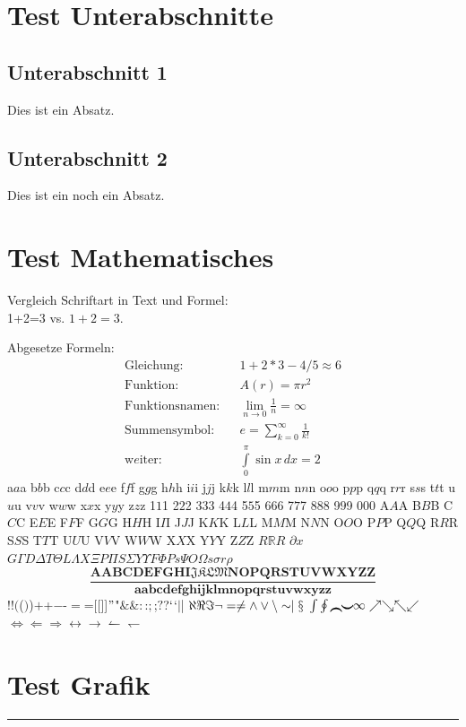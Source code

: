 \documentclass[a0paper,noDIN,MathematikA0]{tudmathposter}
\begin{document}
\begin{multicols}{2}
\section*{Test Unterabschnitte}
\subsection*{Unterabschnitt 1}
Dies ist ein Absatz.
\subsection*{Unterabschnitt 2}
Dies ist ein noch ein Absatz.

\vfill
\section*{Test Mathematisches}
Vergleich Schriftart in Text und Formel:\\
1+2=3 vs. $1+2=3$.

Abgesetze Formeln:
\begin{eqnarray}
\mbox{Gleichung:}&&1+2*3-4/5\approx6\\
\mbox{Funktion:}&&A(r)=\pi r^2\\
\mbox{Funktionsnamen:}&&\lim_{n\to0}\frac{1}{n}=\infty\\
\mbox{Summensymbol:}&&e=\sum_{k=0}^{\infty}\frac{1}{k!}\\
\text{w$e$iter:}&&\int\limits_0^\pi \sin x\,dx = 2
\end{eqnarray}
a$a$a b$b$b c$c$c d$d$d e$e$e f$f$f g$g$g h$h$h i$i$i j$j$j k$k$k
l$l$l m$m$m n$n$n o$o$o p$p$p q$q$q r$r$r s$s$s t$t$t u$u$u v$v$v
w$w$w x$x$x y$y$y z$z$z 1$1$1 2$2$2 3$3$3 4$4$4 5$5$5 6$6$6 7$7$7
8$8$8 9$9$9 0$0$0 A$A$A B$B$B C$C$C E$E$E F$F$F G$G$G H$H$H I$I$I
J$J$J K$K$K L$L$L M$M$M N$N$N O$O$O P$P$P Q$Q$Q R$R$R S$S$S T$T$T
U$U$U V$V$V W$W$W X$X$X Y$Y$Y Z$Z$Z $R\mathbb RR$ $\partial x$
$G\Gamma D\Delta T\Theta L\Lambda X\Xi P\Pi S\Sigma Y\Upsilon F\Phi
Ps\Psi O\Omega s\sigma r\rho$ 
\[
\mathbf{\frac{\text{A}ABCDEFGHI\mathfrak{JKLM}NOPQRSTUVWXYZ\text{Z}}
{\text{a}abcdefghijklmnopqrstuvwxyz\text{z}}}
\]
$!$!$($($)$)$+$+$-$-$=$=$[$[$]$]$"$"$\&$\&$:$:$;$;$?$?$`$`$|$|
$\aleph\Re\Im\neg=\neq\wedge\vee\setminus\sim\mid\mathsection$
$\intop\ointop\braceld\bracerd\bracelu\braceru\infty\nearrow\searrow\nwarrow\swarrow$
$\Leftrightarrow\Leftarrow\Rightarrow\leftrightarrow\rightarrow\leftharpoonup\leftharpoondown$

\vfill
\section*{Test Grafik}
\rule{\linewidth}{2cm}
\end{multicols}
\end{document}
